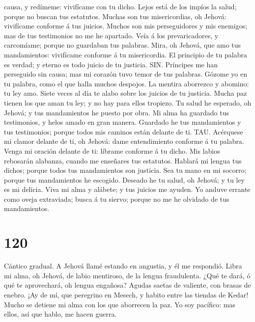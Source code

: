 causa, y redímeme: vivifícame con tu dicho.  Lejos está
de los impíos la salud; porque no buscan tus estatutos. 
Muchas son tus misericordias, oh Jehová: vivifícame conforme á tus
juicios.  Muchos son mis perseguidores y mis enemigos;
mas de tus testimonios no me he apartado.  Veía á los
prevaricadores, y carcomíame; porque no guardaban tus palabras.
 Mira, oh Jehová, que amo tus mandamientos: vivifícame
conforme á tu misericordia.  El principio de tu palabra
es verdad; y eterno es todo juicio de tu justicia.  SIN.
Príncipes me han perseguido sin causa; mas mi corazón tuvo temor de tus
palabras.  Gózome yo en tu palabra, como el que halla
muchos despojos.  La mentira aborrezco y abomino: tu ley
amo.  Siete veces al día te alabo sobre los juicios de
tu justicia.  Mucha paz tienen los que aman tu ley; y no
hay para ellos tropiezo.  Tu salud he esperado, oh
Jehová; y tus mandamientos he puesto por obra.  Mi alma
ha guardado tus testimonios, y helos amado en gran manera.
 Guardado he tus mandamientos y tus testimonios; porque
todos mis caminos están delante de ti.  TAU. Acérquese
mi clamor delante de ti, oh Jehová: dame entendimiento conforme á tu
palabra.  Venga mi oración delante de ti: líbrame
conforme á tu dicho.  Mis labios rebosarán alabanza,
cuando me enseñares tus estatutos.  Hablará mi lengua
tus dichos; porque todos tus mandamientos son justicia. 
Sea tu mano en mi socorro; porque tus mandamientos he escogido.
 Deseado he tu salud, oh Jehová; y tu ley es mi delicia.
 Viva mi alma y alábete; y tus juicios me ayuden.
 Yo anduve errante como oveja extraviada; busca á tu
siervo; porque no me he olvidado de tus mandamientos.

\hypertarget{section-119}{%
\section{120}\label{section-119}}

 Cántico gradual. A Jehová llamé estando en angustia, y él
me respondió.  Libra mi alma, oh Jehová, de labio
mentiroso, de la lengua fraudulenta.  ¿Qué te dará, ó qué
te aprovechará, oh lengua engañosa?  Agudas saetas de
valiente, con brasas de enebro.  ¡Ay de mí, que peregrino
en Mesech, y habito entre las tiendas de Kedar!  Mucho se
detiene mi alma con los que aborrecen la paz.  Yo soy
pacífico: mas ellos, así que hablo, me hacen guerra.

